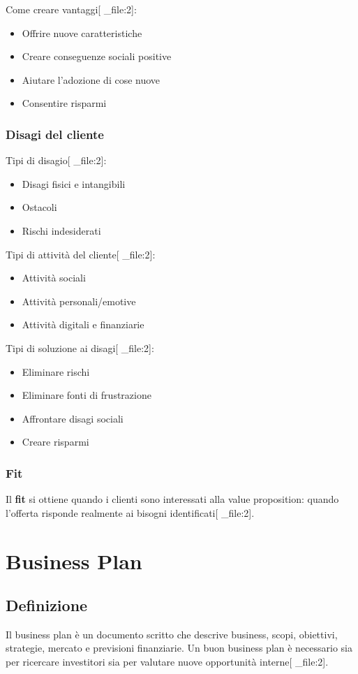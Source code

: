\documentclass[12pt,a4paper]{article}
\begin{document}
Come creare vantaggi[ _file:2]:
\begin{itemize}
    \item Offrire nuove caratteristiche
    \item Creare conseguenze sociali positive
    \item Aiutare l'adozione di cose nuove
    \item Consentire risparmi
\end{itemize}

\subsubsection{Disagi del cliente}
Tipi di disagio[ _file:2]:
\begin{itemize}
    \item Disagi fisici e intangibili
    \item Ostacoli
    \item Rischi indesiderati
\end{itemize}

Tipi di attività del cliente[ _file:2]:
\begin{itemize}
    \item Attività sociali
    \item Attività personali/emotive
    \item Attività digitali e finanziarie
\end{itemize}

Tipi di soluzione ai disagi[ _file:2]:
\begin{itemize}
    \item Eliminare rischi
    \item Eliminare fonti di frustrazione
    \item Affrontare disagi sociali
    \item Creare risparmi
\end{itemize}

\subsubsection{Fit}
Il \textbf{fit} si ottiene quando i clienti sono interessati alla value proposition: quando l'offerta risponde realmente ai bisogni identificati[ _file:2].

\section{Business Plan}

\subsection{Definizione}
Il business plan è un documento scritto che descrive business, scopi, obiettivi, strategie, mercato e previsioni finanziarie. Un buon business plan è necessario sia per ricercare investitori sia per valutare nuove opportunità interne[ _file:2].
\end{document}
